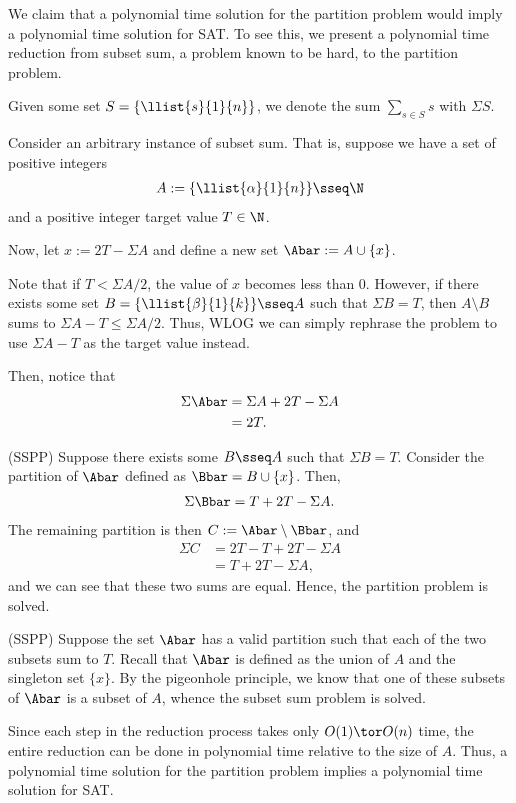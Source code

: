 \documentclass{article}
\begin{document}
\begin{solution}
We claim that a polynomial time solution for the partition problem would imply a polynomial time solution for SAT.
To see this, we present a polynomial time reduction from subset sum, a problem known to be hard, to the partition problem.

\begin{notation}
Given some set $ S = \{\llist{s}{1}{n}\}$, we denote the sum $ \sum\limits_{s\in S}s $ with  $  \Sigma S $.
\end{notation}

Consider an arbitrary instance of subset sum.
That is, suppose we have a set of positive integers \begin{align*}
  A := \{\llist{\alpha}{1}{n}\} \sseq \N
\end{align*}
and a positive integer target value $ T\in \N $.

Now, let $ x := 2T-\Sigma A $ and define a new set $ \Abar := A\cup \{x\}$.

Note that if $ T < \Sigma A/{2} $, the value of $ x $ becomes less than 0.
However, if there exists some set $ B = \{\llist{\beta}{1}{k}\}\sseq A $ such that $ \Sigma B = T $, then $ A\setminus B $ sums to $ \Sigma A - T \leq \Sigma A/{2} $.
Thus, WLOG we can simply rephrase the problem to use $ \Sigma A - T$ as the target value instead.

Then, notice that \begin{align*}
  \Sigma \Abar &= \Sigma A + 2T-\Sigma A \\
  &= 2T.
\end{align*}
\begin{subproof}[Correctness.] (SS\imp PP)
  Suppose there exists some $ B\sseq A $ such that $ \Sigma B = T $.
  Consider the partition of $ \Abar $ defined as $ \Bbar = B\cup \{x\} $.
  Then, \begin{align*}
    \Sigma \Bbar= T + 2T-\Sigma A.
  \end{align*}
  The remaining partition is then $ C := \Abar\setminus \Bbar $, and \begin{align*}
  \Sigma C &= 2T- T + 2T-\Sigma A \\
  &= T + 2T-\Sigma A,
  \end{align*}
  and we can see that these two sums are equal.
  Hence, the partition problem is solved.

  (SS\pmi PP)
  Suppose the set $ \Abar $ has a valid partition such that each of the two subsets sum to $ T $.
  Recall that $ \Abar $ is defined as the union of $ A $ and the singleton set $ \{x\} $.
  By the pigeonhole principle, we know that one of these subsets of $ \Abar $ is a subset of $ A $, whence the subset sum problem is solved.
\end{subproof}
Since each step in the reduction process takes only $ O(1)\tor O(n) $ time, the entire reduction can be done in polynomial time relative to the size of $ A $.
Thus, a polynomial time solution for the partition problem implies a polynomial time solution for SAT.
\end{solution}
\pagebreak
\end{document}
